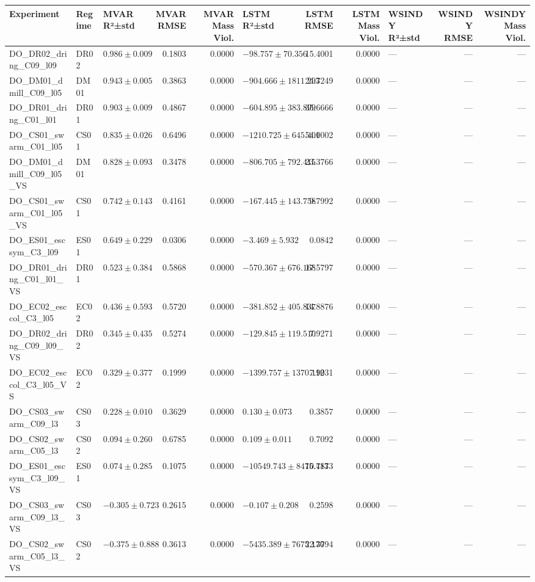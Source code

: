 \begin{tabular}{lllrrlrrlrr}
\toprule
Experiment & Regime & MVAR R²±std & MVAR RMSE & MVAR Mass Viol. & LSTM R²±std & LSTM RMSE & LSTM Mass Viol. & WSINDY R²±std & WSINDY RMSE & WSINDY Mass Viol. \\
\midrule
DO_DR02_dring_C09_l09 & DR02 & $0.986 \pm 0.009$ & 0.1803 & 0.0000 & $-98.757 \pm 70.356$ & 15.4001 & 0.0000 & --- & --- & --- \\
DO_DM01_dmill_C09_l05 & DM01 & $0.943 \pm 0.005$ & 0.3863 & 0.0000 & $-904.666 \pm 1811.293$ & 24.7249 & 0.0000 & --- & --- & --- \\
DO_DR01_dring_C01_l01 & DR01 & $0.903 \pm 0.009$ & 0.4867 & 0.0000 & $-604.895 \pm 383.899$ & 35.6666 & 0.0000 & --- & --- & --- \\
DO_CS01_swarm_C01_l05 & CS01 & $0.835 \pm 0.026$ & 0.6496 & 0.0000 & $-1210.725 \pm 645.401$ & 54.0002 & 0.0000 & --- & --- & --- \\
DO_DM01_dmill_C09_l05_VS & DM01 & $0.828 \pm 0.093$ & 0.3478 & 0.0000 & $-806.705 \pm 792.415$ & 23.3766 & 0.0000 & --- & --- & --- \\
DO_CS01_swarm_C01_l05_VS & CS01 & $0.742 \pm 0.143$ & 0.4161 & 0.0000 & $-167.445 \pm 143.758$ & 9.7992 & 0.0000 & --- & --- & --- \\
DO_ES01_escsym_C3_l09 & ES01 & $0.649 \pm 0.229$ & 0.0306 & 0.0000 & $-3.469 \pm 5.932$ & 0.0842 & 0.0000 & --- & --- & --- \\
DO_DR01_dring_C01_l01_VS & DR01 & $0.523 \pm 0.384$ & 0.5868 & 0.0000 & $-570.367 \pm 676.168$ & 17.5797 & 0.0000 & --- & --- & --- \\
DO_EC02_esccol_C3_l05 & EC02 & $0.436 \pm 0.593$ & 0.5720 & 0.0000 & $-381.852 \pm 405.837$ & 14.8876 & 0.0000 & --- & --- & --- \\
DO_DR02_dring_C09_l09_VS & DR02 & $0.345 \pm 0.435$ & 0.5274 & 0.0000 & $-129.845 \pm 119.510$ & 7.9271 & 0.0000 & --- & --- & --- \\
DO_EC02_esccol_C3_l05_VS & EC02 & $0.329 \pm 0.377$ & 0.1999 & 0.0000 & $-1399.757 \pm 1370.112$ & 7.9031 & 0.0000 & --- & --- & --- \\
DO_CS03_swarm_C09_l3 & CS03 & $0.228 \pm 0.010$ & 0.3629 & 0.0000 & $0.130 \pm 0.073$ & 0.3857 & 0.0000 & --- & --- & --- \\
DO_CS02_swarm_C05_l3 & CS02 & $0.094 \pm 0.260$ & 0.6785 & 0.0000 & $0.109 \pm 0.011$ & 0.7092 & 0.0000 & --- & --- & --- \\
DO_ES01_escsym_C3_l09_VS & ES01 & $0.074 \pm 0.285$ & 0.1075 & 0.0000 & $-10549.743 \pm 8475.413$ & 10.7873 & 0.0000 & --- & --- & --- \\
DO_CS03_swarm_C09_l3_VS & CS03 & $-0.305 \pm 0.723$ & 0.2615 & 0.0000 & $-0.107 \pm 0.208$ & 0.2598 & 0.0000 & --- & --- & --- \\
DO_CS02_swarm_C05_l3_VS & CS02 & $-0.375 \pm 0.888$ & 0.3613 & 0.0000 & $-5435.389 \pm 7675.170$ & 22.3794 & 0.0000 & --- & --- & --- \\
\bottomrule
\end{tabular}
